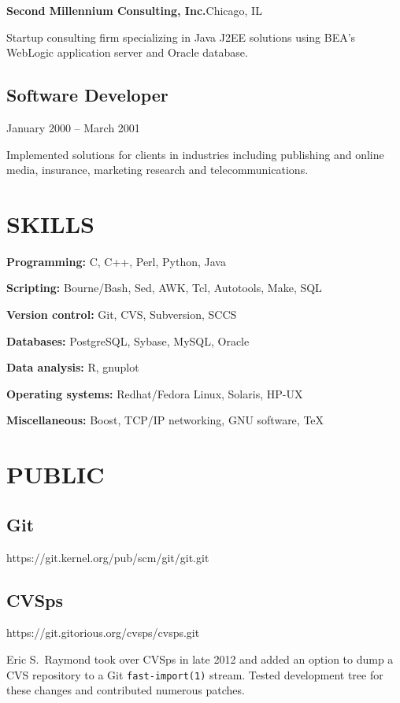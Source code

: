 {\vskip 20pt

{\bf Second Millennium Consulting, Inc.}\quad Chicago, IL

Startup consulting firm specializing in Java J2EE solutions using BEA's
WebLogic application server and Oracle database.

\vskip 5pt
\subsection{Software Developer}
    {January 2000 -- March 2001}

Implemented solutions for clients in industries including publishing and
online media, insurance, marketing research and telecommunications.

}

\section{SKILLS}{%
{\bf Programming:} C, C++, Perl, Python, Java

{\bf Scripting:} Bourne/Bash, Sed, AWK, Tcl, Autotools, Make, SQL

{\bf Version control:} Git, CVS, Subversion, SCCS

{\bf Databases:} PostgreSQL, Sybase, MySQL, Oracle

{\bf Data analysis:} R, gnuplot

{\bf Operating systems:} Redhat/Fedora Linux, Solaris, HP-UX

{\bf Miscellaneous:} Boost, TCP/IP networking, GNU software, \TeX
}

\section{PUBLIC}{%
\parskip=3pt
\subsection{Git}        {\tb https://git.kernel.org/pub/scm/git/git.git}




\vskip 8pt

\subsection{CVSps}       {\tb https://git.gitorious.org/cvsps/cvsps.git}

Eric S.\ Raymond took over CVSps in late 2012 and added an option to
dump a CVS repository to a Git {\tt fast-import(1)} stream.  Tested
development tree for these changes and contributed numerous patches.

}

